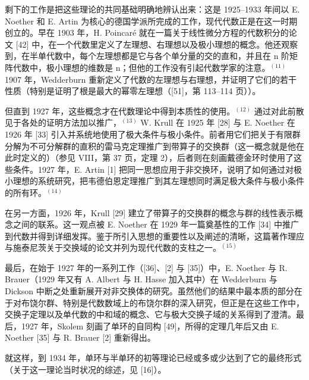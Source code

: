 剩下的工作是把这些理论的共同基础明确地辨认出来：这是 1925--1933 年间以 E. Noether 和 E. Artin 为核心的德国学派所完成的工作，现代代数正是在这一时期创立的。早在 1903 年，H. Poincaré 就在一篇关于线性微分方程的代数积分的论文 {[}42{]} 中，在一个代数里定义了左理想、右理想以及极小理想的概念。他还观察到，在半单代数中，每个左理想都是它与各个单分量的交的直和，并且在 n 阶矩阵代数中，极小理想的维数是 n；但他的工作没有引起代数学家的注意。\(^{(11)}\) 1907 年，Wedderburn 重新定义了代数的左理想与右理想，并证明了它们的若干性质（特别是证明了根是最大的幂零左理想（{[}51{]}，第 113--114 页））。

但直到 1927 年，这些概念才在代数理论中得到本质性的使用。\(^{(12)}\) 通过对此前散见于各处的证明方法加以推广，\(^{(13)}\) W. Krull 在 1925 年 {[}28{]} 与 E. Noether 在 1926 年 {[}33{]} 引入并系统地使用了极大条件与极小条件。前者用它们把关于有限群分解为不可分解群的直积的雷马克定理推广到带算子的交换群（这一概念就是他在此时定义的）（参见 VIII，第 37 页，定理 2），后者则在刻画戴德金环时使用了这些条件。1927 年，E. Artin {[}1{]} 把同一思想应用于非交换环，说明了如何通过对极小理想的系统研究，把韦德伯恩定理推广到其左理想同时满足极大条件与极小条件的所有环。\(^{(14)}\)

在另一方面，1926 年，Krull {[}29{]} 建立了带算子的交换群的概念与群的线性表示概念之间的联系。这一观点被 E. Noether 在 1929 年一篇奠基性的工作 {[}34{]} 中推广到代数并得到详细发挥。鉴于所引入思想的重要性以及阐述的清晰，这篇著作理应与施泰尼茨关于交换域的论文并列为现代代数的支柱之一。\(^{(15)}\)

最后，在始于 1927 年的一系列工作（{[}36{]}、{[}2{]} 与 {[}35{]}）中，E. Noether 与 R. Brauer（1929 年又有 A. Albert 与 H. Hasse 加入其中）在 Wedderburn 与 Dickson 中断之处重新展开对非交换体的研究。虽然他们的结果中最本质的部分在于对布饶尔群、特别是代数数域上的布饶尔群的深入研究，但正是在这些工作中，交换子定理以及单代数的中和域的概念、它与极大交换子域的关系得到了澄清。最后，1927 年，Skolem 刻画了单环的自同构 {[}49{]}，所得的定理几年后又由 E. Noether {[}35{]} 与 R. Brauer {[}2{]} 重新得出。

就这样，到 1934 年，单环与半单环的初等理论已经或多或少达到了它的最终形式（关于这一理论当时状况的综述，见 {[}16{]}）。
\relax{}
